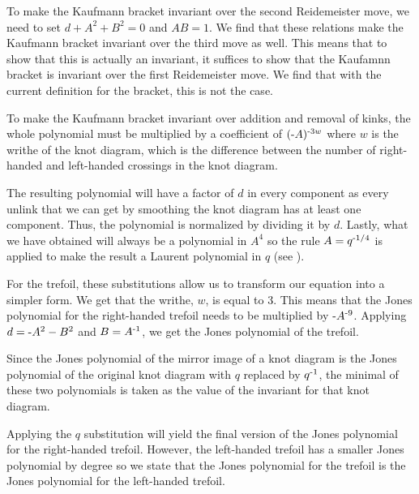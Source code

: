 \begin{paper}

To make the Kaufmann bracket invariant over the second Reidemeister move, we
need to set $d+A^2+B^2=0$ and $AB=1$.
We find that these relations make the Kaufmann bracket invariant over the third
move as well.
This means that to show that this is actually an invariant, it suffices to show
that the Kaufamnn bracket is invariant over the first Reidemeister move.
We find that with the current definition for the bracket, this is not the case.

\noindent\hspace{-1.75in}

\noindent\hspace{-1.75in}

To make the Kaufmann bracket invariant over addition and removal of kinks, the
whole polynomial must be multiplied by a coefficient of $(\text-A)^{\text-3w}$
where $w$ is the writhe of the knot diagram, which is the difference between the
number of right-handed and left-handed crossings in the knot diagram.


The resulting polynomial will have a factor of $d$ in every component as every
unlink that we can get by smoothing the knot diagram has at least one component.
Thus, the polynomial is normalized by dividing it by $d$.
Lastly, what we have obtained will always be a polynomial in $A^4$ so the rule
$A=q^{\text-1/4}$ is applied to make the result a Laurent polynomial in $q$
(see \cite{new}).

For the trefoil, these substitutions allow us to transform our equation into a
simpler form.
We get that the writhe, $w$, is equal to 3.
This means that the Jones polynomial for the right-handed trefoil needs to be
multiplied by $\text-A^{\text-9}$.
Applying $d=\text-A^2-B^2$ and $B=A^{\text-1}$, we get the Jones polynomial of
the trefoil.


Since the Jones polynomial of the mirror image of a knot diagram is the Jones
polynomial of the original knot diagram with $q$ replaced by $q^{\text-1}$, the
minimal of these two polynomials is taken as the value of the invariant for that
knot diagram.

Applying the $q$ substitution will yield the final version of the Jones
polynomial for the right-handed trefoil.
However, the left-handed trefoil has a smaller Jones polynomial by degree so we
state that the Jones polynomial for the trefoil is the Jones polynomial for the
left-handed trefoil.


\end{paper}
